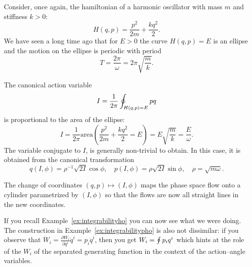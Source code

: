 \documentclass[english,fontsize=11pt,paper=a5,oneside]{scrbook}
\let\d\relax
\newcommand{\d}{\mathrm{d}}
\theoremstyle{definition}
\newenvironment{example}
  {\pushQED{\qed}\renewcommand{\qedsymbol}{$\lozenge$}\examplex}
  {\popQED\endexamplex}
\begin{document}
\begin{example}[Harmonic oscillator]
  Consider, once again, the hamiltonian of a harmonic oscillator with mass $m$ and stiffness $k>0$:
  \begin{equation}
    H(q,p) = \frac{p^2}{2m} + \frac{k q^2}{2}.
  \end{equation}
  We have seen a long time ago that for $E>0$ the curve $H(q,p) = E$ is an ellipse and the motion on the ellipse is periodic with period
  \begin{equation}
    T = \frac{2\pi}{\omega} = 2\pi \sqrt{\frac{m}{k}}.
  \end{equation}

  The canonical action variable
  \begin{equation}
    I = \frac1{2\pi}\oint_{H(q,p) = E} p \d q
  \end{equation}
  is proportional to the area of the ellipse:
  \begin{equation}
    I = \frac1{2\pi} \mathrm{area}\left(\frac{p^2}{2m} + \frac{k q^2}{2} = E\right) = E \sqrt{\frac{m}{k}} = \frac E \omega.
  \end{equation}
  The variable conjugate to $I$, is generally non-trivial to obtain. In this case, it is obtained from the canonical transformation
  \begin{equation}
    q(I, \phi) = \rho^{-1} \sqrt{2I} \cos\phi, \quad
    p(I, \phi) = \rho \sqrt{2I} \sin\phi, \quad
    \rho = \sqrt{m \omega}.
  \end{equation}

  The change of coordinates $(q,p) \mapsto (I, \phi)$ maps the phase space flow onto a cylinder parametrized by $(I, \phi)$ so that the flows are now all straight lines in the new coordinates.

  If you recall Example~\ref{ex:integrabilityho} you can now see what we were doing.
  The construction in Example~\ref{ex:integrabilitypho} is also not dissimilar: if you observe that $\dot W_i = \frac{\partial W_i}{\partial q^i} \dot q^i = p_i \dot q^i$, then you get $W_i = \oint p_i\d q^i$ which hints at the role of the $W_i$ of the separated generating function in the context of the action--angle variables.
\end{example}
\end{document}
